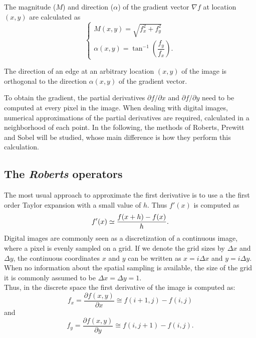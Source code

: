 \documentclass{ipol}
\numberwithin{equation}{section}
\numberwithin{table}{section}
\begin{document}
The magnitude ($M$) and direction ($\alpha$) of the gradient vector $\nabla f$ at location $(x,y)$
are calculated as
\begin{equation}
\label{eq:mag_alpha}
	\begin{cases}
		M(x,y) = \sqrt{f_x^2 + f_y^2} \\
		\alpha(x,y) = \tan^{-1} \left( \dfrac{f_y}{f_x} \right) .
	\end{cases}
\end{equation}

The direction of an edge at an arbitrary location $(x,y)$ of the image is 
orthogonal to the direction $\alpha(x,y)$ of the gradient vector.

To obtain the gradient, the partial derivatives $\partial f/\partial x$ and $\partial f/\partial y$ 
need to be computed at every pixel in the image. When dealing with digital images, numerical approximations 
of the partial derivatives are required, calculated in a neighborhood of each point. In the following,
the methods of Roberts, Prewitt and Sobel will be studied, whose main difference is how they perform this calculation. 


\subsection{The \textit{Roberts} operators}

The most usual approach to approximate the first derivative is to use a the first order Taylor expansion with a small value of $h$. Thus $f'(x)$ is computed as
\begin{equation}
	f'(x) \simeq \frac{f(x+h) - f(x)}{h}.\\
\end{equation}
Digital images are commonly seen as a discretization of a continuous image, where a pixel is evenly sampled on a grid. If we denote the grid sizes by $\Delta x$ and $\Delta y$, the continuous coordinates $x$  and $y$ can be written as $x=i\Delta x$ and $y=i\Delta y$. When no information about the spatial sampling is available, the size of the grid it is commonly assumed to be $\Delta x=\Delta y=1$.\\
Thus, in the discrete space the first derivative of the image is computed as:
\begin{equation}
\label{eq:roberts1}
	f_x = \frac{\partial f(x,y)}{\partial x} \cong f(i+1,j) - f(i,j)
\end{equation}
and
\begin{equation}
\label{eq:roberts2}
	f_y = \frac{\partial f(x,y)}{\partial y} \cong f(i,j+1) - f(i,j).
\end{equation}
\end{document}
